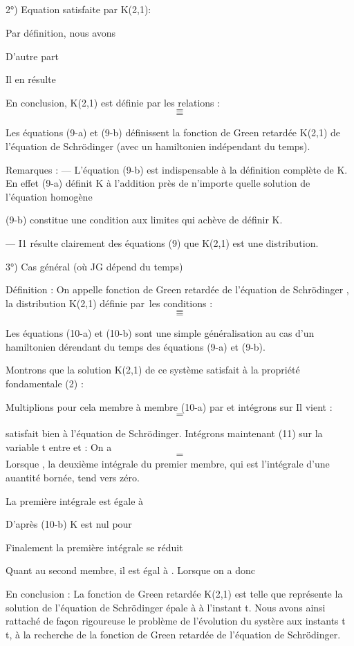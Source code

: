 \subsection{}2°) Equation satisfaite par K(2,1):

Par définition, nous avons

D'autre part


Il en résulte

En conclusion, K(2,1) est définie par les relations :
\[
\tag{9-a}=
\]
\[
\tag{9-b}=
\]

Les équations (9-a) et (9-b) définissent la fonction de Green retardée
K(2,1) de l'équation de Schrödinger (avec un hamiltonien indépendant
du temps).

Remarques :
— L'équation (9-b) est indispensable à la définition complète de K. En
effet (9-a) définit K à l'addition près de n'importe quelle solution de
l'équation homogène

(9-b) constitue une condition aux limites qui achève de définir K.


— I1 résulte clairement des équations (9) que K(2,1) est une distribution.

3°) Cas général (où JG dépend du temps)

Définition : On appelle fonction de Green retardée de l'équation de
Schrödinger , la distribution K(2,1) définie par les
conditions :
\[
\tag{10-a}=
\]
\[
\tag{10-b}=
\]

Les équations (10-a) et (10-b) sont une simple généralisation
au cas d'un hamiltonien dérendant du temps des équations (9-a) et (9-b).

Montrons que la solution K(2,1) de ce système satisfait à la
propriété fondamentale (2) :

Multiplions pour cela membre à membre (10-a) par  et intégrons
sur
Il vient :
\[
\tag{11}=
\]


 satisfait bien à l'équation de Schrödinger.
Intégrons maintenant (11) sur la variable t entre et :
On a
\[
\tag{12}=
\]
Lorsque , la deuxième intégrale du premier membre, qui est l'intégrale
d'une auantité bornée, tend vers zéro.

La première intégrale est égale à

D'après (10-b) K est nul pour

Finalement la première intégrale se réduit

Quant au second membre, il est égal à .
Lorsque  on a donc

En conclusion : La fonction de Green retardée K(2,1) est telle que
 représente la solution de l'équation de
Schrödinger épale à  à l'instant t.
Nous avons ainsi rattaché de façon rigoureuse le problème de
l'évolution du systère aux instants t t, à la recherche de la fonction
de Green retardée de l'équation de Schrödinger.

